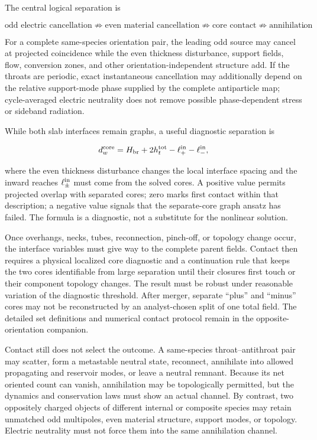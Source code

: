 The central logical separation is

\[
\boxed{
\text{odd electric cancellation}
\not\Rightarrow
\text{even material cancellation}
\not\Rightarrow
\text{core contact}
\not\Rightarrow
\text{annihilation}
}.
\]

For a complete same-species orientation pair, the leading odd source may cancel
at projected coincidence while the even thickness disturbance, support fields,
flow, conversion zones, and other orientation-independent structure add. If the
throats are periodic, exact instantaneous cancellation may additionally depend
on the relative support-mode phase supplied by the complete antiparticle map;
cycle-averaged electric neutrality does not remove possible phase-dependent
stress or sideband radiation.

While both slab interfaces remain graphs, a useful diagnostic separation is

\[
d_w^{\rm core}
=
H_{\rm br}+2h_t^{\rm tot}
-\ell_+^{\rm in}-\ell_-^{\rm in},
\]

where the even thickness disturbance changes the local interface spacing and
the inward reaches \(\ell_\pm^{\rm in}\) must come from the solved cores. A
positive value permits projected overlap with separated cores; zero marks first
contact within that description; a negative value signals that the separate-core
graph ansatz has failed. The formula is a diagnostic, not a substitute for the
nonlinear solution.

Once overhangs, necks, tubes, reconnection, pinch-off, or topology change occur,
the interface variables must give way to the complete parent fields. Contact
then requires a physical localized core diagnostic and a continuation rule that
keeps the two cores identifiable from large separation until their closures
first touch or their component topology changes. The result must be robust under
reasonable variation of the diagnostic threshold. After merger, separate
``plus'' and ``minus'' cores may not be reconstructed by an analyst-chosen split
of one total field. The detailed set definitions and numerical contact protocol
remain in the opposite-orientation companion.

Contact still does not select the outcome. A same-species throat--antithroat pair
may scatter, form a metastable neutral state, reconnect, annihilate into allowed
propagating and reservoir modes, or leave a neutral remnant. Because its net
oriented count can vanish, annihilation may be topologically permitted, but the
dynamics and conservation laws must show an actual channel. By contrast, two
oppositely charged objects of different internal or composite species may retain
unmatched odd multipoles, even material structure, support modes, or topology.
Electric neutrality must not force them into the same annihilation channel.

